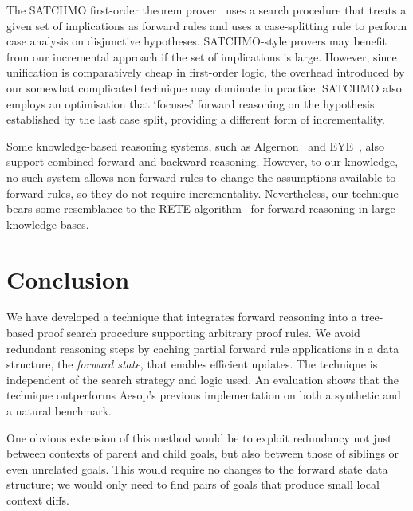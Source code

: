 The SATCHMO first-order theorem prover~\cite{SATCHMO} uses a search procedure that treats a given set of implications as forward rules and uses a case-splitting rule to perform case analysis on disjunctive hypotheses.
SATCHMO-style provers may benefit from our incremental approach if the set of implications is large.
However, since unification is comparatively cheap in first-order logic, the overhead introduced by our somewhat complicated technique may dominate in practice.
SATCHMO also employs an optimisation that \enquote*{focuses} forward reasoning on the hypothesis established by the last case split, providing a different form of incrementality.

Some knowledge-based reasoning systems, such as Algernon~\cite{Algernon} and EYE~\cite{EYE}, also support combined forward and backward reasoning.
However, to our knowledge, no such system allows non-forward rules to change the assumptions available to forward rules, so they do not require incrementality.
Nevertheless, our technique bears some resemblance to the RETE algorithm~\cite{RETE} for forward reasoning in large knowledge bases.

\section{Conclusion}

We have developed a technique that integrates forward reasoning into a tree-based proof search procedure supporting arbitrary proof rules.
We avoid redundant reasoning steps by caching partial forward rule applications in a data structure, the \emph{forward state}, that enables efficient updates.
The technique is independent of the search strategy and logic used.
An evaluation shows that the technique outperforms Aesop's previous implementation on both a synthetic and a natural benchmark.

One obvious extension of this method would be to exploit redundancy not just between contexts of parent and child goals, but also between those of siblings or even unrelated goals.
This would require no changes to the forward state data structure; we would only need to find pairs of goals that produce small local context diffs.
